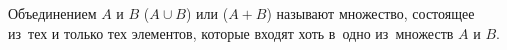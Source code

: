 
    Объединением $A$ и $B$  ($A\cup B$) или ($A+B$) называют множество, состоящее из~тех и только тех элементов, которые входят хоть в~одно из~множеств $A$ и $B$.
